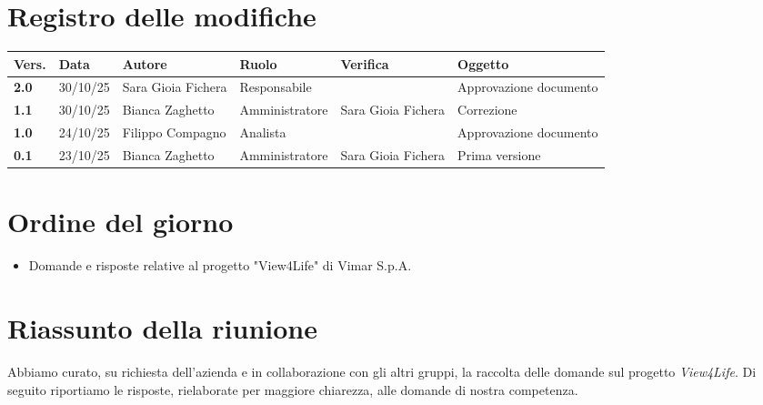 \documentclass[a4paper,12pt]{article}
\begin{document}


\newpage
\section*{Registro delle modifiche}

\begin{table}[h!]
\begin{tabularx}{\textwidth}{|l|l|l|l|L|L|}
\hline
\textbf{Vers.} & \textbf{Data} & \textbf{Autore} & \textbf{Ruolo} & \textbf{Verifica} & \textbf{Oggetto} \\
\hline
\textbf{2.0} & 30/10/25 & Sara Gioia Fichera & Responsabile &  & Approvazione documento \\
\textbf{1.1} & 30/10/25 & Bianca Zaghetto & Amministratore & Sara Gioia Fichera & Correzione \\
\textbf{1.0} & 24/10/25 & Filippo Compagno & Analista &  & Approvazione documento \\
\textbf{0.1} & 23/10/25 & Bianca Zaghetto & Amministratore & Sara Gioia Fichera & Prima versione \\
\hline
\end{tabularx}
\end{table}


\newpage
\tableofcontents
\newpage

\section{Ordine del giorno}
\begin{itemize}
    \item Domande e risposte relative al progetto "View4Life" di Vimar S.p.A.
\end{itemize}

\section{Riassunto della riunione}
Abbiamo curato, su richiesta dell’azienda e in collaborazione con gli altri gruppi, la raccolta delle domande sul progetto \textit{View4Life}.
Di seguito riportiamo le risposte, rielaborate per maggiore chiarezza, alle domande di nostra competenza.
\end{document}
